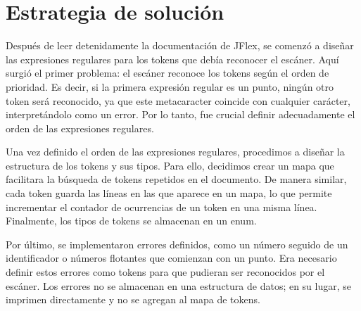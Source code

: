 \documentclass[a4paper,12pt]{article}
\begin{document}
\section*{Estrategia de solución}
\begin{flushleft}
    \hspace*{2em} Después de leer detenidamente la documentación 
    de JFlex, se comenzó a diseñar las expresiones regulares 
    para los tokens que debía reconocer el escáner. Aquí surgió 
    el primer problema: el escáner reconoce los tokens según 
    el orden de prioridad. Es decir, si la primera expresión 
    regular es un punto, ningún otro token será reconocido, 
    ya que este metacaracter coincide con cualquier carácter, 
    interpretándolo como un error. Por lo tanto, fue crucial 
    definir adecuadamente el orden de las expresiones regulares. \par
    \vspace{1em}
    \hspace*{2em} Una vez definido el orden de las expresiones 
    regulares, procedimos a diseñar la estructura de los tokens 
    y sus tipos. Para ello, decidimos crear un mapa que facilitara 
    la búsqueda de tokens repetidos en el documento. De manera 
    similar, cada token guarda las líneas en las que aparece 
    en un mapa, lo que permite incrementar el contador de 
    ocurrencias de un token en una misma línea. Finalmente, 
    los tipos de tokens se almacenan en un enum. \par
    \vspace{1em}
    \hspace*{2em} Por último, se implementaron errores 
    definidos, como un número seguido de un identificador 
    o números flotantes que comienzan con un punto. Era 
    necesario definir estos errores como tokens para que 
    pudieran ser reconocidos por el escáner. Los errores no 
    se almacenan en una estructura de datos; en su lugar, se 
    imprimen directamente y no se agregan al mapa de tokens. \par
    \vspace{1em}
\end{flushleft}

\newpage

\end{document}
